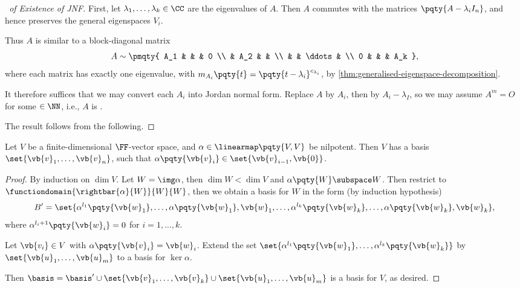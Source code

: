 \begin{proof}[\proofname\ of Existence of JNF]
    First, let \(\lambda_1, \ldots, \lambda_k \in \CC\) are the eigenvalues of \(A\). Then \(A\) commutes with the matrices \(\pqty{A - \lambda_i I_n}\), and hence preserves the general eigenspaces \(V_i\).

    Thus \(A\) is similar to a block-diagonal matrix
    \[
        A \sim \pmqty{
            A_1 & & & 0 \\
             & A_2 & & \\
             & & \ddots & \\
            0 & &  & A_k
        },
    \]
    where each matrix has exactly one eigenvalue, with \(m_{A_i}\pqty{t} = \pqty{t - \lambda_i}^{c_{\lambda_i}}\), by \autoref{thm:generalised-eigenspace-decomposition}.

    It therefore suffices that we may convert each \(A_i\) into Jordan normal form. Replace \(A\) by \(A_i\), then by \(A_i - \lambda_I\), so we may assume \(A^m = O\) for some \( \in \NN\), i.e., \(A\) is .

    The result follows from the following.
\end{proof}

\begin{theorem}
    Let \(V\) be a finite-dimensional \(\FF\)-vector space, and \(\alpha \in \linearmap\pqty{V, V}\) be nilpotent. Then \(V\) has a basis \(\set{\vb{v}_1, \ldots, \vb{v}_n}\), such that \(\alpha\pqty{\vb{v}_i} \in \set{\vb{v}_{i - 1}, \vb{0}}\).
\end{theorem}

\begin{proof}
    By induction on \(\dim V\). Let \(W = \img \alpha\), then \(\dim W < \dim V\) and \(\alpha\pqty{W} \subspace W\). Then restrict to \(\functiondomain{\rightbar{\alpha}{W}}{W}{W}\), then we obtain a basis for \(W\) in the form (by induction hypothesis)
    \[
        B' = \set{\alpha^{l_1}\pqty{\vb{w}_1}, \ldots, \alpha\pqty{\vb{w}_1}, \vb{w}_1, \ldots, \alpha^{l_k}\pqty{\vb{w}_k}, \ldots, \alpha\pqty{\vb{w}_k}, \vb{w}_k},
    \]
    where \(\alpha^{l_i + 1}\pqty{\vb{w}_i} = 0\) for \(i = 1, \ldots, k\).

    Let \(\vb{v_i} \in V\) with \(\alpha\pqty{\vb{v}_i} = \vb{w}_i\). Extend the set \(\set{\alpha^{l_1} \pqty{\vb{w}_1}, \ldots, \alpha^{l_k} \pqty{\vb{w}_k}}\) by \(\set{\vb{u}_1, \ldots, \vb{u}_m}\) to a basis for \(\ker \alpha\).

    Then \(\basis = \basis' \cup \set{\vb{v}_1, \ldots, \vb{v}_k} \cup \set{\vb{u}_1, \ldots, \vb{u}_m}\) is a basis for \(V\), as desired.
\end{proof}